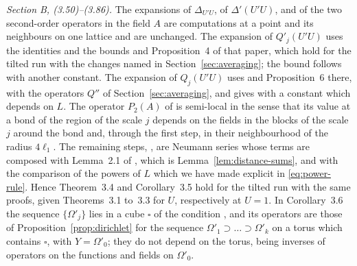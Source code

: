 \documentclass[11pt]{preprint}
\numberwithin{equation}{section}
\theoremstyle{definition}
\theoremstyle{remark}
\theoremstyle{plain}
\begin{document}
\emph{Section B, (3.50)--(3.86).} The expansions \cite[(3.50)--(3.54), (3.69)--(3.75)]{BalabanPBG} of $\Delta_{U'U}$, of $\Delta'(U'U)$, and of the two second-order operators in the field $A$ are computations at a point and its neighbours on one lattice and are unchanged. The expansion \cite[(3.55)--(3.59)]{BalabanPBG} of $Q'_j(U'U)$ uses the identities \cite[(97), (102), (103)]{BalabanAVG} and the bounds \cite[(161), (162)]{BalabanAVG} and Proposition~4 of that paper, which hold for the tilted run with the changes named in Section~\ref{sec:averaging}; the bound \cite[(3.58)]{BalabanPBG} follows with another constant. The expansion \cite[(3.78)--(3.81)]{BalabanPBG} of $Q_j(U'U)$ uses \cite[(124), (140), (141), (143)]{BalabanAVG} and Proposition~6 there, with the operators $Q''$ of Section~\ref{sec:averaging}, and gives \cite[(3.81)]{BalabanPBG} with a constant which depends on $L$. The operator $P_2(A)$ of \cite[(3.82), (3.83)]{BalabanPBG} is semi-local in the sense that its value at a bond of the region of the scale $j$ depends on the fields in the blocks of the scale $j$ around the bond and, through the first step, in their neighbourhood of the radius $4\ell_1$. The remaining steps, \cite[(3.60)--(3.68), (3.76), (3.77), (3.84)--(3.86)]{BalabanPBG}, are Neumann series whose terms are composed with Lemma~2.1 of \cite{BalabanPRT2}, which is Lemma~\ref{lem:distance-sums}, and with the comparison of the powers of $L$ which we have made explicit in \eqref{eq:power-rule}. Hence Theorem~3.4 and Corollary~3.5 hold for the tilted run with the same proofs, given Theorems~3.1 to~3.3 for $U$, respectively at $U = 1$. In Corollary~3.6 the sequence $\{ \Omega'_j \}$ lies in a cube $\square$ of the condition \cite[(3.35)]{BalabanPBG}, and its operators are those of Proposition~\ref{prop:dirichlet} for the sequence $\Omega'_1 \supset \dots \supset \Omega'_k$ on a torus which contains $\square$, with $Y = \Omega'_0$; they do not depend on the torus, being inverses of operators on the functions and fields on $\Omega'_0$.
\end{document}
